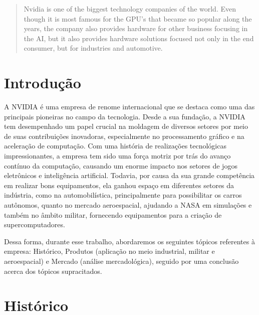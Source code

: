 \documentclass[conference]{IEEEtran}
\begin{document}
\begin{abstract}
Nvidia is one of the biggest technology companies of the world. Even though it is most famous for the GPU's that became so popular along the years, the company also provides hardware for other business focusing in the AI, but it also provides hardware solutions focused not only in the end consumer, but for industries and automotive.
\end{abstract}

\section{Introdução}
\par A NVIDIA é uma empresa de renome internacional que se destaca como uma das principais pioneiras no campo da tecnologia. Desde a sua fundação, a NVIDIA tem desempenhado um papel crucial na moldagem de diversos setores por meio de suas contribuições inovadoras, especialmente no processamento gráfico e na aceleração de computação. Com uma história de realizações tecnológicas impressionantes, a empresa tem sido uma força motriz por trás do avanço contínuo da computação, causando um enorme impacto nos setores de jogos eletrônicos e inteligência artificial. Todavia, por causa da sua grande competência em realizar bons equipamentos, ela ganhou espaço em diferentes setores da indústria, como na automobilística, principalmente para possibilitar os carros autônomos, quanto no mercado aeroespacial, ajudando a NASA em simulações e também no âmbito militar, fornecendo equipamentos para a criação de supercomputadores.
\par Dessa forma, durante esse trabalho, abordaremos os seguintes tópicos referentes à empresa: Histórico, Produtos (aplicação no meio industrial, militar e aeroespacial) e Mercado (análise mercadológica), seguido por uma conclusão acerca dos tópicos supracitados.

\section{Histórico}
\end{document}
